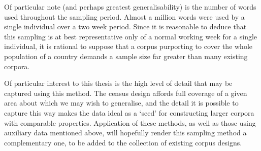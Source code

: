 Of particular note (and perhaps greatest generalisability) is the number of words used throughout the sampling period.  Almost a million words were used by a single individual over a two week period.  Since it is reasonable to deduce that this sampling is at best representative only of a normal working week for a single individual, it is rational to suppose that a corpus purporting to cover the whole population of a country demands a sample size far greater than many existing corpora.



Of particular interest to this thesis is the high level of detail that may be captured using this method.  The census design affords full coverage of a given area about which we may wish to generalise, and the detail it is possible to capture this way makes the data ideal as a `seed' for constructing larger corpora with comparable properties.  Application of these methods, as well as those using auxiliary data mentioned above, will hopefully render this sampling method a complementary one, to be added to the collection of existing corpus designs.





